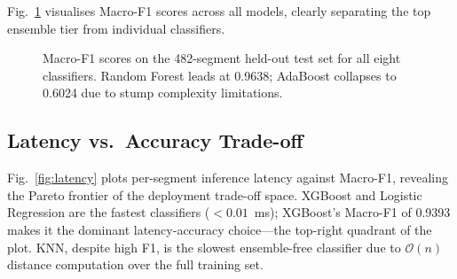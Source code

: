 \documentclass[conference]{IEEEtran}
\begin{document}
Fig.~\ref{fig:f1bar} visualises Macro-F1 scores across all models, clearly separating the top ensemble tier from individual classifiers.

\begin{figure}[t]
\centering
{}
\caption{Macro-F1 scores on the 482-segment held-out test set for all eight classifiers. Random Forest leads at 0.9638; AdaBoost collapses to 0.6024 due to stump complexity limitations.}
\label{fig:f1bar}
\end{figure}

\subsection{Latency vs.\ Accuracy Trade-off}

Fig.~\ref{fig:latency} plots per-segment inference latency against Macro-F1, revealing the Pareto frontier of the deployment trade-off space. XGBoost and Logistic Regression are the fastest classifiers ($<0.01$~ms); XGBoost's Macro-F1 of 0.9393 makes it the dominant latency-accuracy choice---the top-right quadrant of the plot. KNN, despite high F1, is the slowest ensemble-free classifier due to $\mathcal{O}(n)$ distance computation over the full training set.
\end{document}
